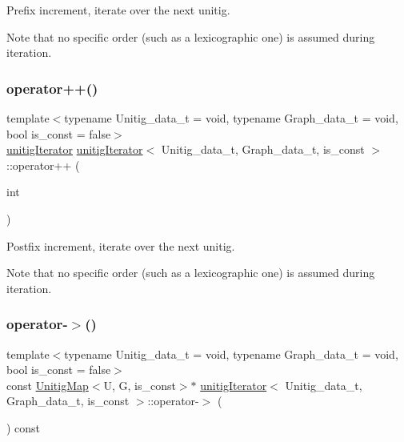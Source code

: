 Prefix increment, iterate over the next unitig. 

Note that no specific order (such as a lexicographic one) is assumed during iteration. \mbox{\label{classunitigIterator_aafb3c6c0095f40975ada699e738654ff}} 
\subsubsection{\texorpdfstring{operator++()}{operator++()}\hspace{0.1cm}{\footnotesize\ttfamily [2/2]}}
{\footnotesize\ttfamily template$<$typename Unitig\+\_\+data\+\_\+t  = void, typename Graph\+\_\+data\+\_\+t  = void, bool is\+\_\+const = false$>$ \\
\hyperlink{classunitigIterator}{unitig\+Iterator} \hyperlink{classunitigIterator}{unitig\+Iterator}$<$ Unitig\+\_\+data\+\_\+t, Graph\+\_\+data\+\_\+t, is\+\_\+const $>$\+::operator++ (\begin{DoxyParamCaption}\item[{int}]{ }\end{DoxyParamCaption})}



Postfix increment, iterate over the next unitig. 

Note that no specific order (such as a lexicographic one) is assumed during iteration. \mbox{\label{classunitigIterator_a5067c731a37401bb0a4fdedc31389d36}} 
\subsubsection{\texorpdfstring{operator-\/$>$()}{operator->()}}
{\footnotesize\ttfamily template$<$typename Unitig\+\_\+data\+\_\+t  = void, typename Graph\+\_\+data\+\_\+t  = void, bool is\+\_\+const = false$>$ \\
const \hyperlink{classUnitigMap}{Unitig\+Map}$<$U, G, is\+\_\+const$>$$\ast$ \hyperlink{classunitigIterator}{unitig\+Iterator}$<$ Unitig\+\_\+data\+\_\+t, Graph\+\_\+data\+\_\+t, is\+\_\+const $>$\+::operator-\/$>$ (\begin{DoxyParamCaption}{ }\end{DoxyParamCaption}) const}



